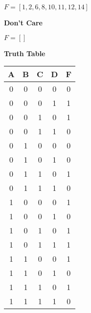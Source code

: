 $F = [1, 2, 6, 8, 10, 11, 12, 14]$

\textbf{Don't Care }

$F = []$



\textbf{Truth Table }



\begin{tabular}{|c|c|c|c||c|}
\hline
A & B & C & D & F \\

    
        \hline
    
  
  
  0 & 0 & 0 & 0 & 0 \\

    
  
  
  0 & 0 & 0 & 1 & 1 \\

    
  
  
  0 & 0 & 1 & 0 & 1 \\

    
  
  
  0 & 0 & 1 & 1 & 0 \\

    
        \hline
    
  
  
  0 & 1 & 0 & 0 & 0 \\

    
  
  
  0 & 1 & 0 & 1 & 0 \\

    
  
  
  0 & 1 & 1 & 0 & 1 \\

    
  
  
  0 & 1 & 1 & 1 & 0 \\

    
        \hline
    
  
  
  1 & 0 & 0 & 0 & 1 \\

    
  
  
  1 & 0 & 0 & 1 & 0 \\

    
  
  
  1 & 0 & 1 & 0 & 1 \\

    
  
  
  1 & 0 & 1 & 1 & 1 \\

    
        \hline
    
  
  
  1 & 1 & 0 & 0 & 1 \\

    
  
  
  1 & 1 & 0 & 1 & 0 \\

    
  
  
  1 & 1 & 1 & 0 & 1 \\

    
  
  
  1 & 1 & 1 & 1 & 0 \\

\hline
\end{tabular}


